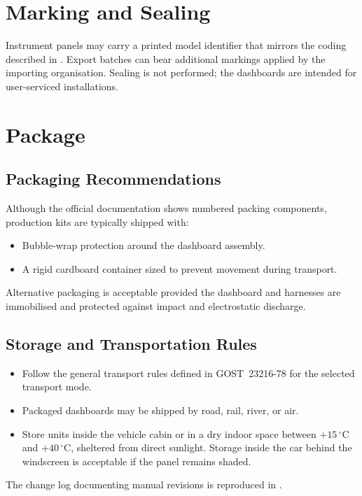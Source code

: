 \chapter{Marking and Sealing} \label{ch:marking}

Instrument panels may carry a printed model identifier that mirrors the coding described in .
Export batches can bear additional markings applied by the importing organisation.
Sealing is not performed; the dashboards are intended for user-serviced installations.

\chapter{Package} \label{ch:package}

\section{Packaging Recommendations}

Although the official documentation shows numbered packing components, production kits are typically shipped with:
\begin{itemize}
    \item Bubble-wrap protection around the dashboard assembly.
    \item A rigid cardboard container sized to prevent movement during transport.
\end{itemize}
Alternative packaging is acceptable provided the dashboard and harnesses are immobilised and protected against impact and electrostatic discharge.

\section{Storage and Transportation Rules}

\begin{itemize}
    \item Follow the general transport rules defined in GOST~23216-78 for the selected transport mode.
    \item Packaged dashboards may be shipped by road, rail, river, or air.
    \item Store units inside the vehicle cabin or in a dry indoor space between \(+15\,^{\circ}\mathrm{C}\) and \(+40\,^{\circ}\mathrm{C}\), sheltered from direct sunlight. Storage inside the car behind the windscreen is acceptable if the panel remains shaded.
\end{itemize}

The change log documenting manual revisions is reproduced in .
